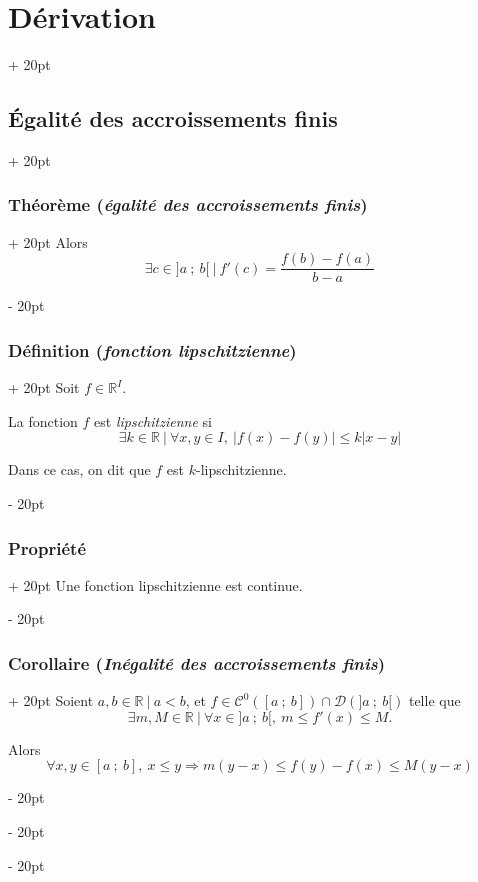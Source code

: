 \documentclass[a4paper, 12pt, twoside]{article}
\newcommand{\R}{\mathbb{R}} %
\newcommand{\seg}[2]{\left[ #1\ ;\ #2 \right]}
\newcommand{\lr}[1]{\left( #1 \right)}
\newcommand{\abs}[1]{\left\lvert #1 \right\rvert}
\renewcommand{\le}{\leqslant}
\newcommand{\ind}[1][20pt]{\advance\leftskip + #1}
\newcommand{\deind}[1][20pt]{\advance\leftskip - #1}
\newenvironment{indt}[2][20pt]{#2 \par \ind[#1]}{\par \deind} %
\begin{document}
\begin{indt}{\section{Dérivation}}
\begin{indt}{\subsection{\'Egalité des accroissements finis}}
\begin{indt}{\subsubsection{Théorème (\textit{égalité des accroissements finis})}}
                Alors
                \[
                    \exists c \in ]a\ ;\ b[\ |\ f'(c) = \dfrac{f(b) - f(a)}{b - a}
                \]
            \end{indt}

            \vspace{12pt}
            
            \begin{indt}{\subsubsection{Définition (\textit{fonction lipschitzienne})}}
                Soit $f \in \R^I$.

                La fonction $f$ est \textit{lipschitzienne} si
                \[
                    \exists k \in \R\ |\
                    \forall x, y \in I,\
                    \abs{f(x) - f(y)} \le k\abs{x - y}
                \]

                Dans ce cas, on dit que $f$ est $k$-lipschitzienne.
            \end{indt}

            \vspace{12pt}
            
            \begin{indt}{\subsubsection{Propriété}}
                Une fonction lipschitzienne est continue.
            \end{indt}

            \vspace{12pt}
            
            \begin{indt}{\subsubsection{Corollaire (\textit{Inégalité des accroissements finis})}}
                Soient $a, b \in \R\ |\ a < b$, et $f \in \mathcal C^0\!\lr{\seg a b} \cap \mathcal D\!\lr{]a\ ;\ b[}$ telle que
                \[
                    \exists m, M \in \R\ |\
                    \forall x \in ]a\ ;\ b[,\
                    m \le f'(x) \le M.
                \]

                Alors
                \[
                    \forall x, y \in \seg a b,\
                    x \le y \Rightarrow
                    m(y - x) \le f(y) - f(x) \le M(y - x)
                \]


\end{indt}
\end{indt}
\end{indt}
\end{document}
